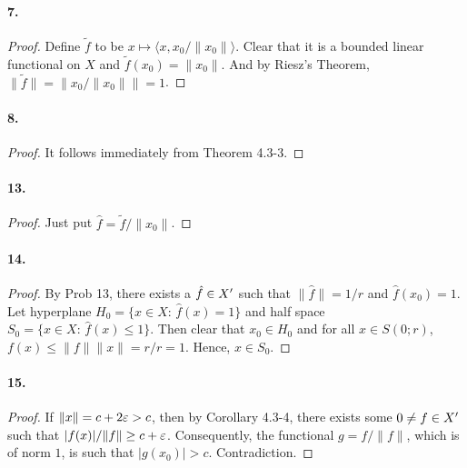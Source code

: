   \paragraph{7.}
  \begin{proof}
    Define $\tilde{f}$ to be $x\mapsto\langle x, x_0/\|x_0\|\rangle$. Clear that
    it is a bounded linear functional on $X$ and $\tilde{f}(x_0)=\|x_0\|$. And
    by Riesz's Theorem, $\|\tilde{f}\|=\|x_0/\|x_0\|\|=1$.
  \end{proof}
  
  \paragraph{8.}
  \begin{proof}
    It follows immediately from Theorem 4.3-3.
  \end{proof}
  
  \paragraph{13.}
  \begin{proof}
    Just put $\hat{f}=\tilde{f}/\|x_0\|$.
  \end{proof}
  
  \paragraph{14.}
  \begin{proof}
    By Prob 13, there exists a $\hat{f}\in X^\prime$ such that $\|\hat{f}\|=1/r$ and
    $\hat{f}(x_0)=1$. Let hyperplane $H_0=\{x\in X:\, \hat{f}(x)=1\}$ and half
    space $S_0=\{x\in X:\, \hat{f}(x)\le 1\}$. Then clear that $x_0\in H_0$ and
    for all $x\in S(0;r)$, $f(x) \le \|f\|\|x\| = r/r =1$. Hence, $x\in S_0$.
  \end{proof}
  
  \paragraph{15.}
  \begin{proof}
    If $\|x\|=c+2\varepsilon>c$, then by Corollary 4.3-4, there exists some $0\ne f\in
    X^\prime$ such that $|f(x)|/\|f\|\ge c+\varepsilon$. Consequently, the functional $g=f/
    \|f\|$, which is of norm $1$, is such that $|g(x_0)|>c$. Contradiction.
  \end{proof}














